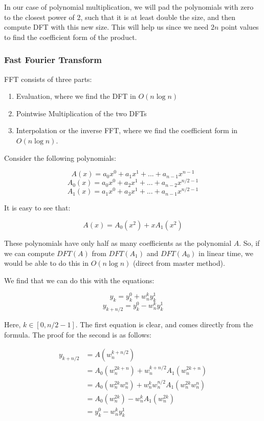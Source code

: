 \documentclass[12pt,letterpaper]{article}
\theoremstyle{definition}
\begin{document}
In our case of polynomial multiplication, we will pad the polynomials with zero to the closest power of 2, such that it is at least double the size, and then compute DFT with this new size. This will help us since we need $2n$ point values to find the coefficient form of the product.

\subsubsection{Fast Fourier Transform}

FFT consists of three parts:

\begin{enumerate}
  \item Evaluation, where we find the DFT in $O(n\log n)$
  \item Pointwise Multiplication of the two DFTs
  \item Interpolation or the inverse FFT, where we find the coefficient form in $O(n \log n)$.
\end{enumerate}

Consider the following polynomials:

\[A(x) = a_0x^0 + a_1x^1 + ... + a_{n-1}x^{n-1}\]
\[A_0(x) = a_0x^0 + a_2x^1 + ... + a_{n-2}x^{n/2-1}\]
\[A_1(x) = a_1x^0 + a_3x^1 + ... + a_{n-1}x^{n/2-1}\]

It is easy to see that:

\[A(x) = A_0(x^2) + xA_1(x^2)\]

These polynomials have only half as many coefficients as the polynomial $A$. So, if we can compute $DFT(A)$ from $DFT(A_1)$ and $DFT(A_0)$ in linear time, we would be able to do this in $O(n \log n)$ (direct from master method).

We find that we can do this with the equations:

\[y_k = y_k^0 + w_n^k y_k^1\]
\[y_{k+n/2} = y_k^0 - w_n^k y_k^1\]

Here, $k \in [0,n/2-1]$. The first equation is clear, and comes directly from the formula. The proof for the second is as follows:

\begin{align*}
  y_{k+n/2} &= A(w_n^{k+n/2}) \\
            &= A_0(w_n^{2k+n}) + w_n^{k+n/2}A_1(w_n^{2k+n}) \\
            &= A_0(w_n^{2k} w_{n}^n) + w_n^k w_n^{n/2} A_1(w_n^{2k} w_n^{n}) \\
            &= A_0 (w_n^{2k}) - w_n^kA_1(w_n^{2k}) \\
            &= y_k^0 - w_n^k y_k^1
\end{align*}
\end{document}
